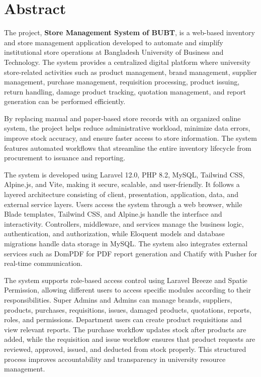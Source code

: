 \chapter*{Abstract}

The project, \textbf{Store Management System of BUBT}, is a web-based inventory and store management application developed to automate and simplify institutional store operations at Bangladesh University of Business and Technology. The system provides a centralized digital platform where university store-related activities such as product management, brand management, supplier management, purchase management, requisition processing, product issuing, return handling, damage product tracking, quotation management, and report generation can be performed efficiently.

By replacing manual and paper-based store records with an organized online system, the project helps reduce administrative workload, minimize data errors, improve stock accuracy, and ensure faster access to store information. The system features automated workflows that streamline the entire inventory lifecycle from procurement to issuance and reporting.

The system is developed using Laravel 12.0, PHP 8.2, MySQL, Tailwind CSS, Alpine.js, and Vite, making it secure, scalable, and user-friendly. It follows a layered architecture consisting of client, presentation, application, data, and external service layers. Users access the system through a web browser, while Blade templates, Tailwind CSS, and Alpine.js handle the interface and interactivity. Controllers, middleware, and services manage the business logic, authentication, and authorization, while Eloquent models and database migrations handle data storage in MySQL. The system also integrates external services such as DomPDF for PDF report generation and Chatify with Pusher for real-time communication.

The system supports role-based access control using Laravel Breeze and Spatie Permission, allowing different users to access specific modules according to their responsibilities. Super Admins and Admins can manage brands, suppliers, products, purchases, requisitions, issues, damaged products, quotations, reports, roles, and permissions. Department users can create product requisitions and view relevant reports. The purchase workflow updates stock after products are added, while the requisition and issue workflow ensures that product requests are reviewed, approved, issued, and deducted from stock properly. This structured process improves accountability and transparency in university resource management.

